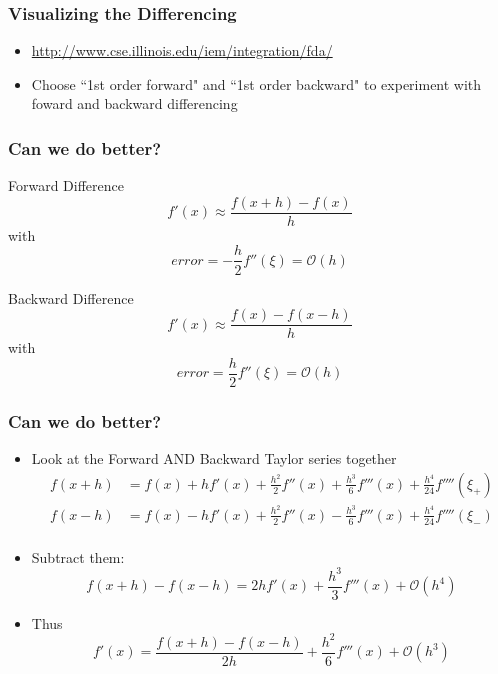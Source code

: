 \documentclass[10pt]{beamer}
\newcommand{\mO}{{\mathcal{O}}}
\begin{document}
\begin{frame}
\frametitle{Visualizing the Differencing}
\begin{itemize}
    \item \url{http://www.cse.illinois.edu/iem/integration/fda/}
    \item Choose ``1st order forward" and ``1st order backward" to 
        experiment with foward and backward differencing
\end{itemize}
\end{frame}
\begin{frame}
\frametitle{Can we do better?}
\begin{block}{Forward Difference}
\begin{equation*}
  f'(x) \approx \frac{f(x+h)-f(x)}{h}
\end{equation*}
with
\begin{equation*}
  error = - \frac{h}{2}f''(\xi) = \mO(h)
\end{equation*}
\end{block}
\begin{block}{Backward Difference}
\begin{equation*}
  f'(x) \approx \frac{f(x)-f(x-h)}{h}
\end{equation*}
with
\begin{equation*}
  error = \frac{h}{2}f''(\xi) = \mO(h)
\end{equation*}
\end{block}
\end{frame}
\begin{frame}
\frametitle{Can we do better?}
\begin{itemize}
    \item Look at the Forward AND Backward Taylor series together
    \begin{align*}
      f(x+h) & = f(x) + h f'(x) + \frac{h^2}{2}f''(x) + \frac{h^3}{6}f'''(x) + \frac{h^4}{24}f''''(\xi_{+})\\
      f(x-h) & = f(x) - h f'(x) + \frac{h^2}{2}f''(x) - \frac{h^3}{6}f'''(x) + \frac{h^4}{24}f''''(\xi_{-})\\
    \end{align*}

    \item<2-> Subtract them:
    \begin{equation*}
      f(x+h) - f(x-h) = 2 h f'(x) + \frac{h^3}{3}f'''(x) + \mO(h^4)
    \end{equation*}
    \item<3-> Thus
    \begin{equation*}
      f'(x) = \frac{f(x+h) - f(x-h)}{2 h} + \frac{h^2}{6}f'''(x) + \mO(h^3)
    \end{equation*}
\end{itemize}
\end{frame}
\end{document}
